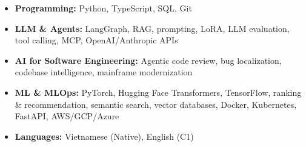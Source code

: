 \begin{itemize}[itemsep=0.5pt,topsep=1pt]
    \item \textbf{Programming:} Python, TypeScript, SQL, Git
    \item \textbf{LLM \& Agents:} LangGraph, RAG, prompting, LoRA, LLM evaluation, tool calling, MCP, OpenAI/Anthropic APIs
    \item \textbf{AI for Software Engineering:} Agentic code review, bug localization, codebase intelligence, mainframe modernization
    \item \textbf{ML \& MLOps:} PyTorch, Hugging Face Transformers, TensorFlow, ranking \& recommendation, semantic search, vector databases, Docker, Kubernetes, FastAPI, AWS/GCP/Azure
    \item \textbf{Languages:} Vietnamese (Native), English (C1)
\end{itemize}
